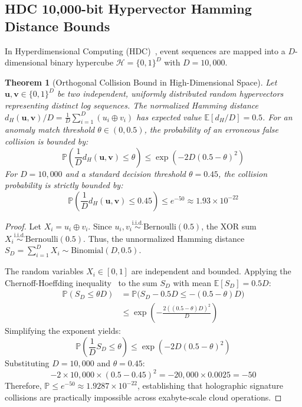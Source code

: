 \documentclass[letterpaper,twocolumn,10pt]{article}
\newtheorem{theorem}{Theorem}
\begin{document}
\subsection{HDC 10,000-bit Hypervector Hamming Distance Bounds}
In Hyperdimensional Computing (HDC)~\cite{kanerva2009hyperdimensional}, event sequences are mapped into a $D$-dimensional binary hypercube $\mathcal{H} = \{0, 1\}^D$ with $D = 10{,}000$.

\begin{theorem}[Orthogonal Collision Bound in High-Dimensional Space]
\label{thm:hdc_bound}
Let $\mathbf{u}, \mathbf{v} \in \{0, 1\}^D$ be two independent, uniformly distributed random hypervectors representing distinct log sequences. The normalized Hamming distance $d_H(\mathbf{u}, \mathbf{v}) / D = \frac{1}{D} \sum_{i=1}^D (u_i \oplus v_i)$ has expected value $\mathbb{E}[d_H/D] = 0.5$. For an anomaly match threshold $\theta \in (0, 0.5)$, the probability of an erroneous false collision is bounded by:
\begin{equation}
\mathbb{P}\left(\frac{1}{D} d_H(\mathbf{u}, \mathbf{v}) \le \theta\right) \le \exp\left(-2 D (0.5 - \theta)^2\right)
\end{equation}
For $D = 10{,}000$ and a standard decision threshold $\theta = 0.45$, the collision probability is strictly bounded by:
\begin{equation}
\mathbb{P}\left(\frac{1}{D} d_H(\mathbf{u}, \mathbf{v}) \le 0.45\right) \le e^{-50} \approx 1.93 \times 10^{-22}
\end{equation}
\end{theorem}

\begin{proof}
Let $X_i = u_i \oplus v_i$. Since $u_i, v_i \stackrel{\text{i.i.d.}}{\sim} \text{Bernoulli}(0.5)$, the XOR sum $X_i \stackrel{\text{i.i.d.}}{\sim} \text{Bernoulli}(0.5)$. Thus, the unnormalized Hamming distance $S_D = \sum_{i=1}^D X_i \sim \text{Binomial}(D, 0.5)$. 

The random variables $X_i \in [0, 1]$ are independent and bounded. Applying the Chernoff-Hoeffding inequality~\cite{hoeffding1963probability} to the sum $S_D$ with mean $\mathbb{E}[S_D] = 0.5 D$:
\begin{align}
\mathbb{P}(S_D \le \theta D) &= \mathbb{P}\big(S_D - 0.5 D \le -(0.5 - \theta) D\big) \nonumber \\
&\le \exp\left(- \frac{2 ((0.5 - \theta)D)^2}{D}\right)
\end{align}
Simplifying the exponent yields:
\begin{equation}
\mathbb{P}\left(\frac{1}{D} S_D \le \theta\right) \le \exp\left(-2 D (0.5 - \theta)^2\right)
\end{equation}
Substituting $D = 10{,}000$ and $\theta = 0.45$:
\begin{equation}
-2 \times 10{,}000 \times (0.5 - 0.45)^2 = -20{,}000 \times 0.0025 = -50
\end{equation}
Therefore, $\mathbb{P} \le e^{-50} \approx 1.9287 \times 10^{-22}$, establishing that holographic signature collisions are practically impossible across exabyte-scale cloud operations.
\end{proof}
\end{document}
